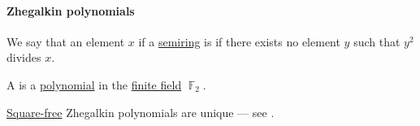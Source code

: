 \paragraph{Zhegalkin polynomials}

\begin{definition}\label{def:square_free_element}
  We say that an element \( x \) if a \hyperref[def:semiring]{semiring} is  if there exists no element \( y \) such that \( y^2 \) divides \( x \).
\end{definition}

\begin{definition}\label{def:zhegalkin_polynomial}
  A  is a \hyperref[def:polynomial_algebra/polynomials]{polynomial} in the \hyperref[def:finite_field]{finite field} \( \BbbF_2 \).
\end{definition}
\begin{comments}
  \item \hyperref[def:square_free_element]{Square-free} Zhegalkin polynomials are unique --- see .
\end{comments}

